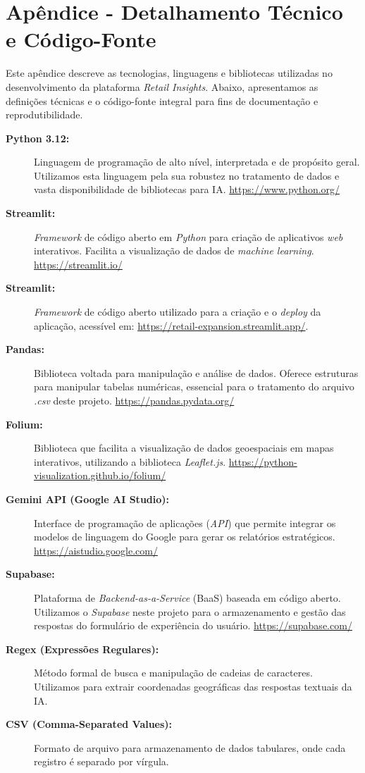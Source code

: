 \section{\esp Apêndice - Detalhamento Técnico e Código-Fonte}

Este apêndice descreve as tecnologias, linguagens e bibliotecas utilizadas no desenvolvimento da plataforma \textit{Retail Insights}. Abaixo, apresentamos as definições técnicas e o código-fonte integral para fins de documentação e reprodutibilidade.

\begin{description}
    \item[\textbf{Python 3.12:}] Linguagem de programação de alto nível, interpretada e de propósito geral. Utilizamos esta linguagem pela sua robustez no tratamento de dados e vasta disponibilidade de bibliotecas para IA. \url{https://www.python.org/}
    
    \item[\textbf{Streamlit:}] \textit{Framework} de código aberto em \textit{Python} para criação de aplicativos \textit{web} interativos. Facilita a visualização de dados de \textit{machine learning}. \url{https://streamlit.io/}

    \item[\textbf{Streamlit:}] \textit{Framework} de código aberto utilizado para a criação e o \textit{deploy} da aplicação, acessível em: \url{https://retail-expansion.streamlit.app/}.
    
    \item[\textbf{Pandas:}] Biblioteca voltada para manipulação e análise de dados. Oferece estruturas para manipular tabelas numéricas, essencial para o tratamento do arquivo \textit{.csv} deste projeto. \url{https://pandas.pydata.org/}
    
    \item[\textbf{Folium:}] Biblioteca que facilita a visualização de dados geoespaciais em mapas interativos, utilizando a biblioteca \textit{Leaflet.js}. \url{https://python-visualization.github.io/folium/}
    
    \item[\textbf{Gemini API (Google AI Studio):}] Interface de programação de aplicações (\textit{API}) que permite integrar os modelos de linguagem do Google para gerar os relatórios estratégicos. \url{https://aistudio.google.com/}

    \item[\textbf{Supabase:}] Plataforma de \textit{Backend-as-a-Service} (BaaS) baseada em código aberto. Utilizamos o \textit{Supabase} neste projeto para o armazenamento e gestão das respostas do formulário de experiência do usuário. \url{https://supabase.com/}
    
    \item[\textbf{Regex (Expressões Regulares):}] Método formal de busca e manipulação de cadeias de caracteres. Utilizamos para extrair coordenadas geográficas das respostas textuais da IA.
    
    \item[\textbf{CSV (Comma-Separated Values):}] Formato de arquivo para armazenamento de dados tabulares, onde cada registro é separado por vírgula.
\end{description}

